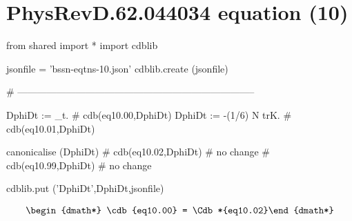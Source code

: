 \documentclass[12pt]{cdblatex}
\begin{document}
\section*{PhysRevD.62.044034 equation (10)}

\begin{cadabra}
   from shared import *
   import cdblib

   jsonfile = 'bssn-eqtns-10.json'
   cdblib.create (jsonfile)

   # --------------------------------------------------------------------------

   DphiDt  := \partial_{t}{\phi}.                # cdb(eq10.00,DphiDt)
   DphiDt  := -(1/6) N trK.                      # cdb(eq10.01,DphiDt)

   canonicalise (DphiDt)                         # cdb(eq10.02,DphiDt)  # no change
                                                 # cdb(eq10.99,DphiDt)  # no change

   cdblib.put ('DphiDt',DphiDt,jsonfile)
\end{cadabra}

\begin{dgroup*}
   \begin{dmath*} \cdb{eq10.00} = \Cdb*{eq10.02}\end{dmath*}
\end{dgroup*}
\end{document}

